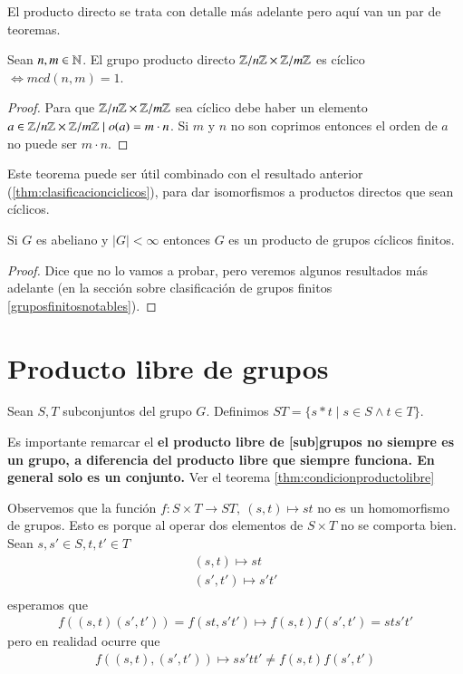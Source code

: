 El producto directo se trata con detalle más adelante pero aquí van un par de teoremas.

\begin{thm}
	Sean $n, m \in \mathbb{N}$. El grupo producto directo $\mathbb{Z}/n\mathbb{Z} \times \mathbb{Z}/m\mathbb{Z}$ es cíclico $\iff mcd(n,m) = 1$.
\end{thm}

\begin{proof}
	Para que $\mathbb{Z}/n\mathbb{Z} \times \mathbb{Z}/m\mathbb{Z}$ sea cíclico debe haber un elemento $a \in \mathbb{Z}/n\mathbb{Z} \times \mathbb{Z}/m\mathbb{Z} \mid o(a) = m\cdot n$. Si $m$ y $n$ no son coprimos entonces el orden de $a$ no puede ser $m\cdot n$. %
\end{proof}

Este teorema puede ser útil combinado con el resultado anterior (\autoref{thm:clasificacionciclicos}), para dar isomorfismos a productos directos que sean cíclicos.

\begin{thm}
	\label{thm:noprobado1}
	Si $G$ es abeliano y $|G| < \infty$ entonces $G$ es un producto de grupos cíclicos finitos.
\end{thm}

\begin{proof}
	Dice que no lo vamos a probar, pero veremos algunos resultados más adelante (en la sección sobre clasificación de grupos finitos \ref{gruposfinitosnotables}).
\end{proof}


\section{Producto libre de grupos}

\begin{dfn}
	\label{dfn:productolibre}
	Sean $S,T$ subconjuntos del grupo $G$. Definimos $ST = \{s\ast t \mid s \in S \land t \in T\}$.
\end{dfn}

Es importante remarcar el \textbf{el producto libre de [sub]grupos no siempre es un grupo, a diferencia del producto libre que siempre funciona. En general solo es un conjunto.} Ver el teorema \ref{thm:condicionproductolibre}

Observemos que la función $f: S \times T \to ST,\ (s,t) \mapsto st$ no es un homomorfismo de grupos. Esto es porque al operar dos elementos de $S \times T$ no se comporta bien. Sean $s,s'\in S, t,t'\in T$
\begin{align*}
(s,t) \mapsto st \\
(s',t') \mapsto s't' \\
\end{align*}
esperamos que 
\begin{align*}
f((s,t)(s',t')) = f(st, s't') \mapsto f(s,t)f(s',t') = sts't'
\end{align*}
pero en realidad ocurre que
\begin{align*}
f((s,t),(s',t')) \mapsto ss'tt' \neq f(s,t)f(s',t')
\end{align*}

